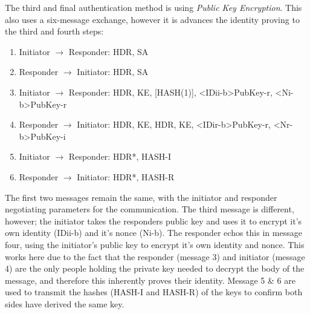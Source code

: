 The third and final authentication method is using \textit{Public Key Encryption}. This also uses a six-message exchange, however it is advances the identity proving to the third and fourth steps:
\begin{enumerate}
    \item Initiator $\rightarrow$ Responder: HDR, SA
    \item Responder $\rightarrow$ Initiator: HDR, SA
    \item Initiator $\rightarrow$ Responder: HDR, KE, [HASH(1)], <IDii-b>PubKey-r, <Ni-b>PubKey-r
    \item Responder $\rightarrow$ Initiator: HDR, KE, HDR, KE, <IDir-b>PubKey-r, <Nr-b>PubKey-i
    \item Initiator $\rightarrow$ Responder: HDR*, HASH-I
    \item Responder $\rightarrow$ Initiator: HDR*, HASH-R
\end{enumerate}

The first two messages remain the same, with the initiator and responder negotiating parameters for the communication. The third message is different, however; the initiator takes the responders public key and uses it to encrypt it's own identity (IDii-b) and it's nonce (Ni-b). The responder echos this in message four, using the initiator's public key to encrypt it's own identity and nonce. This works here due to the fact that the responder (message 3) and initiator (message 4) are the only people holding the private key needed to decrypt the body of the message, and therefore this inherently proves their identity. Message 5 \& 6 are used to transmit the hashes (HASH-I and HASH-R) of the keys to confirm both sides have derived the same key.


